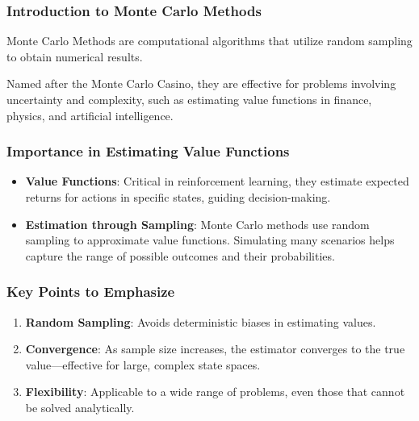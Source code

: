 \documentclass[aspectratio=169]{beamer}
\begin{document}
\frame{\titlepage}

\begin{frame}[fragile]
    \frametitle{Introduction to Monte Carlo Methods}
    Monte Carlo Methods are computational algorithms that utilize random sampling to obtain numerical results.
    
    Named after the Monte Carlo Casino, they are effective for problems involving uncertainty and complexity, such as estimating value functions in finance, physics, and artificial intelligence.
\end{frame}

\begin{frame}[fragile]
    \frametitle{Importance in Estimating Value Functions}
    \begin{itemize}
        \item \textbf{Value Functions}: Critical in reinforcement learning, they estimate expected returns for actions in specific states, guiding decision-making.
        
        \item \textbf{Estimation through Sampling}: Monte Carlo methods use random sampling to approximate value functions. Simulating many scenarios helps capture the range of possible outcomes and their probabilities.
    \end{itemize}
\end{frame}

\begin{frame}[fragile]
    \frametitle{Key Points to Emphasize}
    \begin{enumerate}
        \item \textbf{Random Sampling}: Avoids deterministic biases in estimating values.
        
        \item \textbf{Convergence}: As sample size increases, the estimator converges to the true value—effective for large, complex state spaces.
        
        \item \textbf{Flexibility}: Applicable to a wide range of problems, even those that cannot be solved analytically.
    \end{enumerate}
\end{frame}
\end{document}
